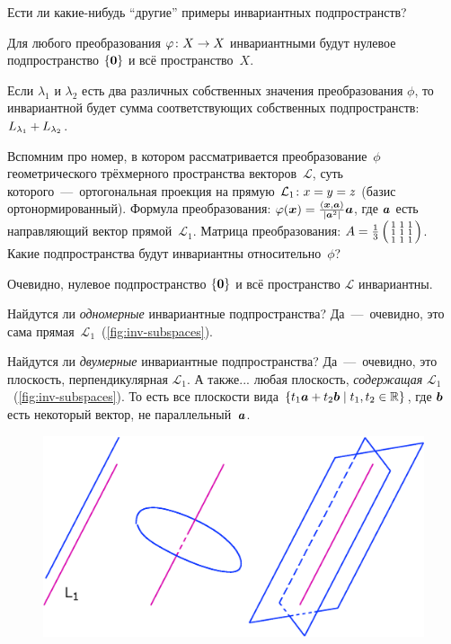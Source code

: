 \documentclass[a4paper,12pt]{article}
\begin{document}
  Ести ли какие-нибудь ``другие'' примеры инвариантных подпространств?
  
  \begin{example}
    Для любого преобразования $\phi\colon X \hm\to X$ инвариантными будут нулевое подпространство $\{\boldsymbol 0\}$ и всё пространство~$X$.
  \end{example}
  
  \begin{example}
    Если $\lambda_1$ и $\lambda_2$ есть два различных собственных значения преобразования $\phi$, то инвариантной будет сумма соответствующих собственных подпространств: $L_{\lambda_1} \hm+ L_{\lambda_2}$.
  \end{example}
  
  \begin{example}
    Вспомним про номер, в котором рассматривается преобразование~$\phi$ геометрического трёхмерного пространства векторов~$\mathcal L$, суть которого~---~ортогональная проекция на прямую $\mathcal L_1\colon x \hm= y \hm= z$ (базис ортонормированный).
    Формула преобразования:
    $
      \phi(\bds x) \hm= \frac{(\bds x, \bds a)}{|\bds a^2|} \bds a
    $,
    где $\boldsymbol a$ есть направляющий вектор прямой~$\mathcal L_1$.
    Матрица преобразования: $A \hm= \frac{1}{3} \left(\begin{smallmatrix}
      1 & 1 & 1\\
      1 & 1 & 1\\
      1 & 1 & 1
    \end{smallmatrix}\right)$.
    Какие подпространства будут инвариантны относительно~$\phi$?
    
    Очевидно, нулевое подпространство $\{\boldsymbol 0\}$ и всё пространство $\mathcal L$ инвариантны.
    
    Найдутся ли \emph{одномерные} инвариантные подпространства?
    Да~---~очевидно, это сама прямая~$\mathcal L_1$~(\ref{fig:inv-subspaces}).
    
    Найдутся ли \emph{двумерные} инвариантные подпространства?
    Да~---~очевидно, это плоскость, перпендикулярная $\mathcal L_1$.
    А также... любая плоскость, \emph{содержащая} $\mathcal L_1$~(\ref{fig:inv-subspaces}).
    То есть все плоскости вида $\{t_1 \bds a \hm+ t_2 \bds b \hm\mid t_1, t_2 \hm\in \RR\}$, где $\boldsymbol b$ есть некоторый вектор, не параллельный~$\boldsymbol a$.
    
    \begin{figure}[h]
      \centering
  
      \includegraphics[width=0.75\columnwidth]{inv-subspaces}
  

\end{figure}
\end{example}
\end{document}
